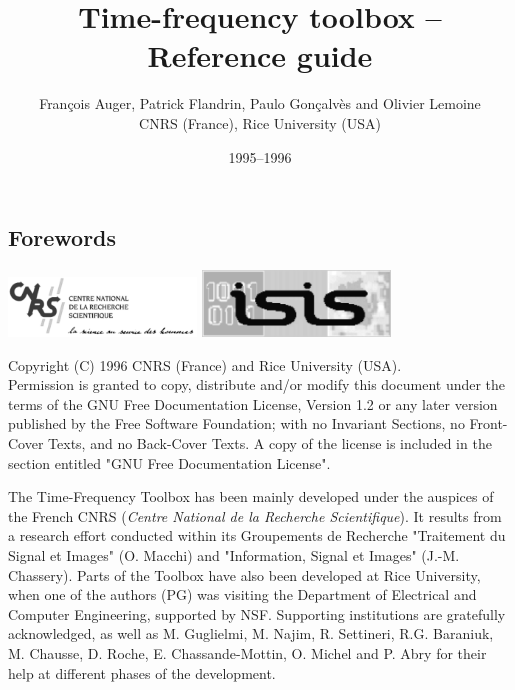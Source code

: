 \documentclass[11pt,a4paper,twoside]{book} %
\title{Time-frequency toolbox -- Reference guide}
\author{Fran\c{c}ois Auger, Patrick Flandrin, Paulo Gon\c{c}alv\`es and Olivier Lemoine\\[5mm] CNRS (France), Rice University (USA)}
\date{1995--1996}
\begin{document}
\begin{htmlonly}
\maketitle
\end{htmlonly}

\begin{latexonly}
\pagestyle{empty}

\end{latexonly}

\cleardoublepage

\begin{htmlonly}
\section*{Forewords}
\end{htmlonly}

\centerline{\includegraphics[width=5cm]{figure/cnrs}\hspace{2cm}
            \includegraphics[width=5cm]{figure/isis}}

\vspace{2 cm}
Copyright (C)  1996 CNRS (France) and Rice University (USA).\\
Permission is granted to copy, distribute and/or modify this document
under the terms of the GNU Free Documentation License, Version 1.2
or any later version published by the Free Software Foundation;
with no Invariant Sections, no Front-Cover Texts, and no Back-Cover
Texts.  A copy of the license is included in the section entitled "GNU
Free Documentation License".

\vspace{2 cm}
The Time-Frequency Toolbox has been mainly developed under the auspices of
the French CNRS ({\em Centre National de la Recherche Scientifique}). It
results from a research effort conducted within its Groupements de
Recherche "Traitement du Signal et Images" (O. Macchi) and "Information,
Signal et Images" (J.-M. Chassery). Parts of the Toolbox have also been
developed at Rice University, when one of the authors (PG) was visiting the
Department of Electrical and Computer Engineering, supported by NSF.
Supporting institutions are gratefully acknowledged, as well as M.
Guglielmi, M. Najim, R. Settineri, R.G. Baraniuk, M. Chausse, D. Roche,
E. Chassande-Mottin, O. Michel and P. Abry for their help at different 
phases of the development.
\end{document}

